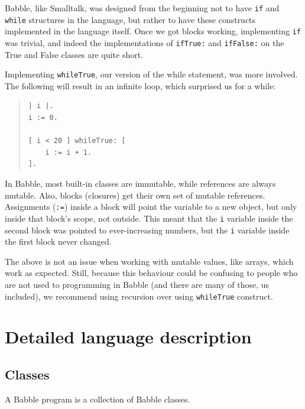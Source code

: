 \documentclass[a4paper]{article}
\begin{document}
Babble, like Smalltalk, was designed from the beginning not to have \texttt{if} and \texttt{while} structures in the language, but rather to have these constructs implemented in the language itself.
Once we got blocks working, implementing \texttt{if} was trivial, and indeed the implementations of \texttt{ifTrue:} and \texttt{ifFalse:} on the True and False classes are quite short.

Implementing \texttt{whileTrue}, our version of the while statement, was more involved. The following will result in an infinite loop, which surprised us for a while:

\begin{quote}
\begin{lstlisting}
| i |.
i := 0.

[ i < 20 ] whileTrue: [
	i := i + 1.
].
\end{lstlisting}
\end{quote}

In Babble, most built-in classes are immutable, while references are always mutable. Also, blocks (closures) get their own set of mutable references. Assignments (\texttt{:=}) inside a block will point the variable to a new object, but only inside that block's scope, not outside. This meant that the \texttt{i} variable inside the second block was pointed to ever-increasing numbers, but the \texttt{i} variable inside the first block never changed.

The above is not an issue when working with mutable values, like arrays, which work as expected. Still, because this behaviour could be confusing to people who are not used to programming in Babble (and there are many of those, us included), we recommend using recursion over using \texttt{whileTrue} construct.

\section{Detailed language description}

\subsection{Classes}
A Babble program is a collection of Babble classes.
\end{document}
